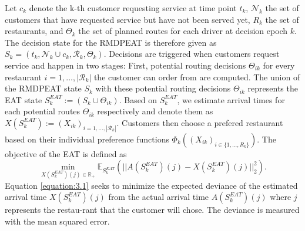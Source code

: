Let $ c_k $ denote the k-th customer requesting service at time point $ t_k $, $ \mathcal{N}_k $ the set of customers that have requested service but have not been served yet, $ R_k $ the set of restaurants, and $ \Theta_k $ the set of planned routes for each driver at decision epoch $ k $. The decision state for the RMDPEAT is therefore given as $ S_k = (t_k, \mathcal{N}_k \cup c_k, \mathcal{R}_k, \Theta_k) $. Decisions are triggered when customers request service and happen in two stages: First, potential routing decisions $ \Theta_{ik} $ for every restaurant $ i = 1, \dots, |\mathcal{R}_k| $ the customer can order from are computed. The union of the RMDPEAT state $ S_k $ with these potential routing decisions $ \Theta_{ik} $ represents the EAT state $ S^{EAT}_k := (S_k \cup \Theta_{ik})$. Based on $ S^{EAT}_k $, we estimate arrival times for each potential routes $ \Theta_{ik} $ respectively and denote them as $ X(S^{EAT}_k) := (X_{ik})_{i = 1, \dots, |\mathcal{R}_k|}$. Customers then choose a prefered restaurant based on their individual preference functions $ \Phi_k((X_{ik})_{i \in \{1,\dots, R_k\}}) $.  
The objective of the EAT is defined as
\begin{equation}\label{equation:3.1}
	\min_{X(S^{EAT}_k)(j) \in \mathbb{R}_+} 
	\mathbb{E}_{S^{EAT}_{k}} 
	(|| A(S^{EAT}_{k})(j) - X(S^{EAT}_{k})(j)||^{2}_{2}).
\end{equation}
Equation \ref{equation:3.1} seeks to minimize the expected deviance of the estimated arrival time $ X(S^{EAT}_{k})(j) $ from the actual arrival time $ A(S^{EAT}_{k})(j) $ where $ j $ represents the restau-rant that the customer will chose. The deviance is measured with the mean squared error. 

    